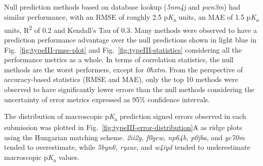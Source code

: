 \documentclass[9pt,lineno,final]{elife}
\newcommand{\pKa}{p\textit{K}\textsubscript{a}}
\begin{document}
Null prediction methods based on database lookup (\textit{5nm4j} and \textit{pwn3m}) had similar performance, with an RMSE of roughly 2.5 \pKa{} units, an MAE of 1.5 \pKa{} units, R\textsuperscript{2} of 0.2 and Kendall's Tau of 0.3.
Many methods were observed to have a prediction performance advantage over the null predictions shown in light blue in Fig.~\ref{fig:typeIII-rmse-plot} and Fig.~\ref{fig:typeIII-statistics} considering all the performance metrics as a whole.
In terms of correlation statistics, the null methods are the worst performers, except for \textit{0hxtm}.
From the perspective of accuracy-based statistics (RMSE and MAE), only the top 10 methods were observed to have significantly lower errors than the null methods considering the uncertainty of error metrics expressed as 95\% confidence intervals.

The distribution of macroscopic \pKa{} prediction signed errors observed in each submission was plotted in Fig.~\ref{fig:typeIII-error-distribution}A as ridge plots using the Hungarian matching scheme.
\textit{2ii2g, f0gew, np64b, p0jba}, and \textit{yc70m} tended to overestimate, while  \textit{
5byn6, ryzue}, and \textit{w4iyd} tended to underestimate macroscopic \pKa{} values. 
\end{document}
